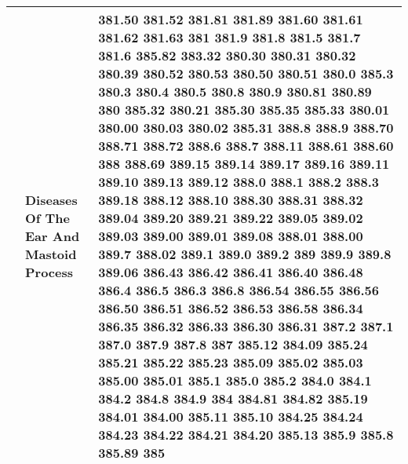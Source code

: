 \begin{longtable}{|L{.1in}|L{.6in}||L{5.65in}|}
    & Diseases Of The Ear And Mastoid Process
  &  381.50 381.52 381.81 381.89 381.60 381.61 381.62 381.63 381 381.9 381.8 381.5 381.7 381.6 385.82 383.32 380.30 380.31 380.32 380.39 380.52 380.53 380.50 380.51 380.0 385.3 380.3 380.4 380.5 380.8 380.9 380.81 380.89 380 385.32 380.21 385.30 385.35 385.33 380.01 380.00 380.03 380.02 385.31 388.8 388.9 388.70 388.71 388.72 388.6 388.7 388.11 388.61 388.60 388 388.69 389.15 389.14 389.17 389.16 389.11 389.10 389.13 389.12 388.0 388.1 388.2 388.3 389.18 388.12 388.10 388.30 388.31 388.32 389.04 389.20 389.21 389.22 389.05 389.02 389.03 389.00 389.01 389.08 388.01 388.00 389.7 388.02 389.1 389.0 389.2 389 389.9 389.8 389.06 386.43 386.42 386.41 386.40 386.48 386.4 386.5 386.3 386.8 386.54 386.55 386.56 386.50 386.51 386.52 386.53 386.58 386.34 386.35 386.32 386.33 386.30 386.31 387.2 387.1 387.0 387.9 387.8 387 385.12 384.09 385.24 385.21 385.22 385.23 385.09 385.02 385.03 385.00 385.01 385.1 385.0 385.2 384.0 384.1 384.2 384.8 384.9 384 384.81 384.82 385.19 384.01 384.00 385.11 385.10 384.25 384.24 384.23 384.22 384.21 384.20 385.13 385.9 385.8 385.89 385
  \\\hline

\end{longtable}
